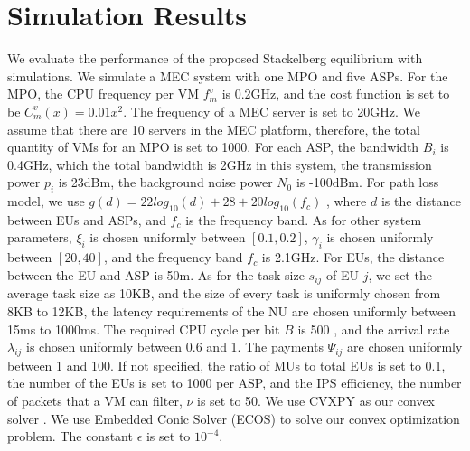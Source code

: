 \documentclass[10pt,journal, compsoc]{IEEEtran}
\begin{document}
\section{Simulation Results} \label{sec:simulation}
We evaluate the performance of the proposed Stackelberg equilibrium with simulations. We simulate a MEC system with one MPO and five ASPs\cite{Zhang3}. For the MPO, the CPU frequency per VM $f_m^v$ is 0.2GHz, and the cost function is set to be $C_m^v(x) = 0.01x^2$. The frequency of a MEC server is set to 20GHz\cite{Liu4}. We assume that there are 10 servers in the MEC platform, therefore, the total quantity of VMs for an MPO is set to 1000. For each ASP, the bandwidth $B_i$ is 0.4GHz, which the total bandwidth is 2GHz in this system, the transmission power $p_i$ is 23dBm\cite{3gpp.36.101}, the background noise power $N_0$ is -100dBm\cite{chen2015efficient}. For path loss model, we use $g(d)=22log_{10}(d)+28+20log_{10}(f_c)$ \cite{3gpp.36.814}, where $d$ is the distance between EUs and ASPs, and $f_c$ is the frequency band. As for other system parameters, $\xi_{i}$ is chosen uniformly between $[0.1, 0.2]$, $\gamma_i$ is chosen uniformly between $[20, 40]$, and the frequency band $f_c$ is 2.1GHz\cite{3gpp.36.101}. For EUs, the distance between the EU and ASP is 50m\cite{Mao}. As for the task size $s_{ij}$ of EU $j$, we set the average task size as 10KB\cite{Ko}, and the size of every task is uniformly chosen from 8KB to 12KB, the latency requirements of the NU are chosen uniformly between 15ms to 1000ms. The required CPU cycle per bit $B$ is 500 \cite{Ko}, and the arrival rate $\lambda_{ij}$ is chosen uniformly between 0.6 and 1\cite{Wu}. The payments $\Psi_{ij}$ are chosen uniformly between 1 and 100. If not specified, the ratio of MUs to total EUs is set to 0.1, the number of the EUs is set to 1000 per ASP, and the IPS efficiency, the number of packets that a VM can filter, $\nu$ is set to 50. We use CVXPY \cite{diamond2016cvxpy} \cite{agrawal2018rewriting} as our convex solver . We use Embedded Conic Solver (ECOS) \cite{bib:Domahidi2013ecos} to solve our convex optimization problem. The constant $\epsilon$ is set to $10^{-4}$. 
\end{document}

